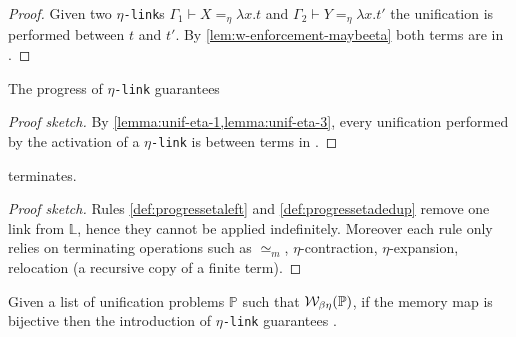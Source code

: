 \documentclass[sigconf,natbib=false,review]{acmart}
\newcommand{\UnifRel}{\ensuremath{\simeq}}
\newcommand{\Ue}{\ensuremath{\UnifRel_m}\xspace}
\newcommand{\linkMacro}[1]{\ensuremath{#1}\texttt{-link}\xspace}
\newcommand{\linketa} {\linkMacro{\eta}}
\newcommand{\linketaM}[3]{\ensuremath{#1 \vdash #2 =_\eta #3}}
\newcommand{\linkStore}{\texorpdfstring{\ensuremath{\mathbb{L}}\xspace}{L}}
\newcommand{\mapStore}{\texorpdfstring{\ensuremath{\mathbb{M}}\xspace}{M}}
\newcommand{\foUnifPb}{\ensuremath{\mathbb{P}}\xspace}
\begin{document}
\begin{proof}
  Given two \linketa{}s \linketaM{\Gamma_1}{X}{\lambda x.t} and
  \linketaM{\Gamma_2}{Y}{\lambda x.t'} 
  the unification is performed between $t$ and $t'$.
  By \cref{lem:w-enforcement-maybeeta} both terms are in
  \wellb.
\end{proof}

\begin{lemma}
  The progress of \linketa guarantees 
  \label{lemma:unif-wellb}
\end{lemma}

\begin{proof}[Proof sketch]
  By \cref{lemma:unif-eta-1,lemma:unif-eta-3}, every
  unification performed by the activation of a \linketa is between
  terms in \wellb.
\end{proof}

\begin{lemma}
   terminates.
  \label{lemma:prog-eta-terminates}
\end{lemma}

\begin{proof}[Proof sketch]
  Rules \ref{def:progressetaleft} and
  \ref{def:progressetadedup} remove one link from \linkStore, hence they
  cannot be applied indefinitely.
  Moreover each rule only relies on terminating operations such as \Ue,
  $\eta$-contraction, $\eta$-expansion, relocation (a recursive copy of a
  finite term).
\end{proof}  

\begin{theorem}
  Given a list of unification problems \foUnifPb such that
  $\wellb_{\beta \eta}(\foUnifPb)$, if the 
  memory map is bijective then
  the introduction 
  of \linketa guarantees .
  \label{lemma:fidelity-maybeeta}
\end{theorem}
\end{document}
